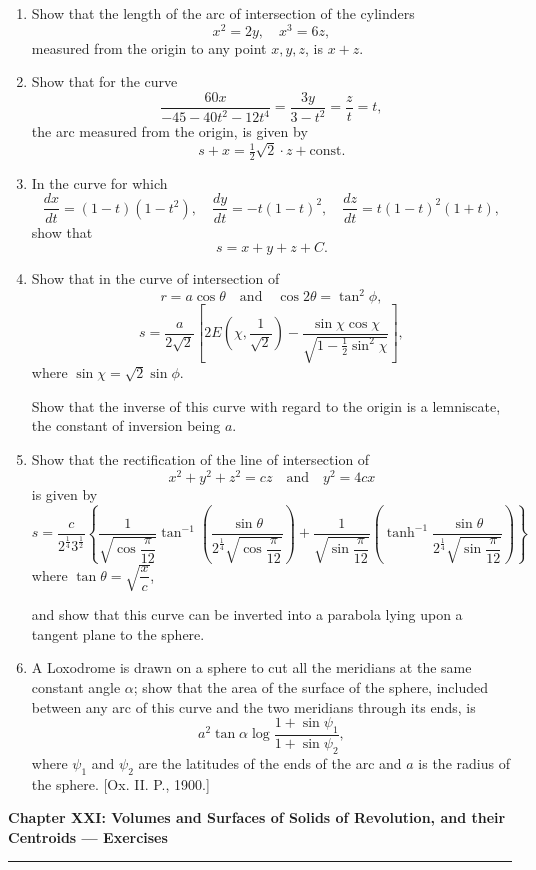 \documentclass[11pt, a4paper]{article}
\newcommand{\source}[1]{\hfill\textnormal{[#1]}}
\begin{document}
\begin{enumerate}[leftmargin=2em]
\item Show that the length of the arc of intersection of the cylinders
\[
x^2=2y,\quad x^3=6z,
\]
measured from the origin to any point $x,y,z$, is $x+z$.

\item Show that for the curve
\[
\frac{60x}{-45-40t^2-12t^4}=\frac{3y}{3-t^2}=\frac{z}{t}=t,
\]
the arc measured from the origin, is given by
\[
s+x=\tfrac12\sqrt2\cdot z+\text{const.}
\]

\item In the curve for which
\[
\frac{dx}{dt}=(1-t)(1-t^2),\quad \frac{dy}{dt}=-t(1-t)^2,\quad \frac{dz}{dt}=t(1-t)^2(1+t),
\]
show that
\[
s=x+y+z+C.
\]

\item Show that in the curve of intersection of
\[
r=a\cos\theta\quad\text{and}\quad \cos2\theta=\tan^2\phi,
\]
\[
s=\frac{a}{2\sqrt2}\left[2E\left(\chi,\frac{1}{\sqrt2}\right)-\frac{\sin\chi\cos\chi}{\sqrt{1-\tfrac12\sin^2\chi}}\right],
\]
where $\sin\chi=\sqrt2\sin\phi$.

Show that the inverse of this curve with regard to the origin is a lemniscate, the constant of inversion being $a$.

\item Show that the rectification of the line of intersection of
\[
x^2+y^2+z^2=cz\quad\text{and}\quad y^2=4cx
\]
is given by
\[
s=\frac{c}{2^{\frac14}3^{\frac12}}\left\{\frac{1}{\sqrt{\cos\dfrac{\pi}{12}}}\tan^{-1}\left(\frac{\sin\theta}{2^{\frac14}\sqrt{\cos\dfrac{\pi}{12}}}\right)+\frac{1}{\sqrt{\sin\dfrac{\pi}{12}}}\left(\tanh^{-1}\frac{\sin\theta}{2^{\frac14}\sqrt{\sin\dfrac{\pi}{12}}}\right)\right\}
\]
where $\tan\theta=\sqrt{\dfrac{x}{c}}$,

and show that this curve can be inverted into a parabola lying upon a tangent plane to the sphere.

\item A Loxodrome is drawn on a sphere to cut all the meridians at the same constant angle $\alpha$; show that the area of the surface of the sphere, included between any arc of this curve and the two meridians through its ends, is
\[
a^2\tan\alpha\log\frac{1+\sin\psi_1}{1+\sin\psi_2},
\]
where $\psi_1$ and $\psi_2$ are the latitudes of the ends of the arc and $a$ is the radius of the sphere. \source{Ox. II. P., 1900.}

\end{enumerate}

\newpage

\begin{center}
    {\LARGE \bfseries \color{accent} Chapter XXI: Volumes and Surfaces of Solids of Revolution, and their Centroids --- Exercises}\\
    \vspace{0.2cm}
    {\color{accent}\rule{0.55\linewidth}{0.8pt}}
\end{center}
\vspace{0.35cm}
\end{document}

